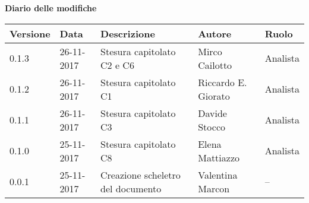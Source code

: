 \documentclass[main.tex]{subfiles}
\begin{document}
\huge \bfseries Diario delle modifiche\\
\begin{table}[htbp]
	\centering
	\renewcommand\arraystretch{1.2}

	\begin{tabularx}{\textwidth}{p{2cm}|p{2cm}|p{4cm}|p{2cm}|p{3cm}}
		\hline
		\textbf{Versione} & \textbf{Data} & \textbf{Descrizione} & \textbf{Autore} & \textbf{Ruolo}\\

		\hline
		0.1.3 & 26-11-2017 & Stesura capitolato C2 e C6 & Mirco Cailotto & Analista \\

		\hline
		0.1.2 & 26-11-2017 & Stesura capitolato C1 & Riccardo E. Giorato & Analista \\
		
		\hline
		0.1.1 & 26-11-2017 & Stesura capitolato C3 & Davide Stocco & Analista \\
		
		\hline
		0.1.0 & 25-11-2017 & Stesura capitolato C8 & Elena Mattiazzo & Analista \\
		
		\hline
		0.0.1 & 25-11-2017 & Creazione scheletro del documento & Valentina Marcon & -- \\
		\hline
	
	\end{tabularx}

\end{table}
\end{document}
